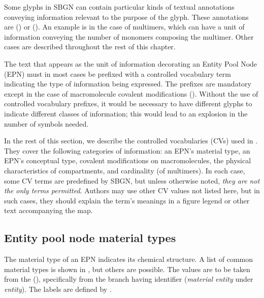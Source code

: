
Some glyphs in SBGN \PDs can contain particular kinds of textual annotations conveying information relevant to the purpose of the glyph.  These annotations are  () or   ().  An example is in the case of multimers, which can have a unit of information conveying the number of monomers composing the multimer.  Other cases are described throughout the rest of this chapter.

The text that appears as the unit of information decorating an Entity Pool Node (EPN) must in most cases be prefixed with a controlled vocabulary term indicating the type of information being expressed.  The prefixes are mandatory except in the case of macromolecule covalent modifications ().  Without the use of controlled vocabulary prefixes, it would be necessary to have different glyphs to indicate different classes of information; this would lead to an explosion in the number of symbols needed.

In the rest of this section, we describe the controlled vocabularies (CVs) used in \SBGNPDLone.  They cover the following categories of information: an EPN's material type, an EPN's conceptual type, covalent modifications on macromolecules, the physical characteristics of compartments, and cardinality (\eg of multimers).  In each case, some CV terms are predefined by SBGN, but unless otherwise noted, \emph{they are not the only terms permitted}.  Authors may use other CV values not listed here, but in such cases, they should explain the term's meanings in a figure legend or other text accompanying the map.


\subsection{Entity pool node material types}
\label{sec:material-types-cv}

The material type of an EPN indicates its chemical structure.  A list of common material types is shown in , but others are possible.  The values are to be taken from the \sbo (\sbourl), specifically from the branch having identifier  ($\!$\emph{material entity} under \emph{entity}).  The labels are defined by \SBGNPDLone.

